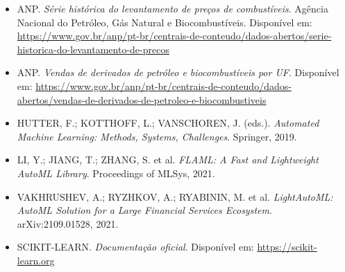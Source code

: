 \documentclass[11pt, a4paper, oneside]{article}
\begin{document}
\begin{itemize}[leftmargin=1.5cm, itemsep=4pt]
  \item ANP. \textit{Série histórica do levantamento de preços de combustíveis}. Agência Nacional do Petróleo, Gás Natural e Biocombustíveis. Disponível em: \url{https://www.gov.br/anp/pt-br/centrais-de-conteudo/dados-abertos/serie-historica-do-levantamento-de-precos}
  \item ANP. \textit{Vendas de derivados de petróleo e biocombustíveis por UF}. Disponível em: \url{https://www.gov.br/anp/pt-br/centrais-de-conteudo/dados-abertos/vendas-de-derivados-de-petroleo-e-biocombustiveis}
  \item HUTTER, F.; KOTTHOFF, L.; VANSCHOREN, J. (eds.). \textit{Automated Machine Learning: Methods, Systems, Challenges}. Springer, 2019.
  \item LI, Y.; JIANG, T.; ZHANG, S. et al. \textit{FLAML: A Fast and Lightweight AutoML Library}. Proceedings of MLSys, 2021.
  \item VAKHRUSHEV, A.; RYZHKOV, A.; RYABININ, M. et al. \textit{LightAutoML: AutoML Solution for a Large Financial Services Ecosystem}. arXiv:2109.01528, 2021.
  \item SCIKIT-LEARN. \textit{Documentação oficial}. Disponível em: \url{https://scikit-learn.org}
\end{itemize}
\end{document}
